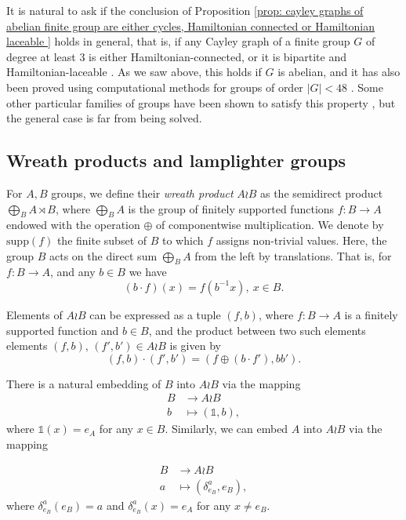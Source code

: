 \documentclass[reqno,oneside]{amsart}
\newcommand{\supp}[1]{\mathrm{supp}(#1)}
\theoremstyle{plain}
\theoremstyle{definition}
\begin{document}
It is natural to ask if the conclusion of Proposition \ref{prop: cayley graphs of abelian finite group are either cycles, Hamiltonian connected or Hamiltonian laceable } holds in general, that is, if any Cayley graph of a finite group $G$ of degree at least $3$ is either Hamiltonian-connected, or it is bipartite and Hamiltonian-laceable \cite[Questions 4.1-4.3]{DupuisWagon2015}. As we saw above, this holds if $G$ is abelian, and it has also been proved using computational methods for groups of order $|G|<48$ \cite{WitteWilk2020}. Some other particular families of groups have been shown to satisfy this property \cite{Araki2006,Alspach2015,AlspachChenMcAvaney1996,AlspachQin2001}, but the general case is far from being solved.

\subsection{Wreath products and lamplighter groups}\label{subsection: wreath prods}\label{subsection:wreath prods}



For $A,B$ groups, we define their \textit{wreath product} $A\wr B$ as the semidirect product $\bigoplus_{B} A \rtimes B$, where $\bigoplus_{B} A $ is the group of finitely supported functions $f:B\to A$ endowed  with the operation $\oplus$ of componentwise multiplication. We denote by $\supp{f}$ the finite subset of $B$ to which $f$ assigns non-trivial values. Here, the group $B$ acts on the direct sum $\bigoplus_{B} A $ from the left by translations. That is, for $f:B\to A$, and any $b\in B$ we have
$$
(b\cdot f)(x)=f(b^{-1}x), \ x\in B.
$$

Elements of $A\wr B$ can be expressed as a tuple $(f,b)$, where $f:B\to A$ is a finitely supported function and $b\in B$, and the product between two such elements elements $(f,b)$, $(f',b')\in A\wr B$ is given by
$$
(f,b)\cdot(f',b')= (f\oplus (b\cdot f'),bb').
$$


There is a natural embedding of $B$ into $A\wr B$ via the mapping
\begin{align*}
B&\to A\wr B\\
b&\mapsto (\mathds{1},b),
\end{align*}
where $\mathds{1}(x)=e_A$ for any $x\in B$. Similarly, we can embed $A$ into $A\wr B$ via the mapping

\begin{align*}
B&\to A\wr B\\
a&\mapsto (\delta^{a}_{e_B},e_B),
\end{align*}
where $\delta^{a}_{e_B}(e_B)=a$ and $\delta^{a}_{e_B}(x)=e_A$ for any $x\neq e_B$.
\end{document}

